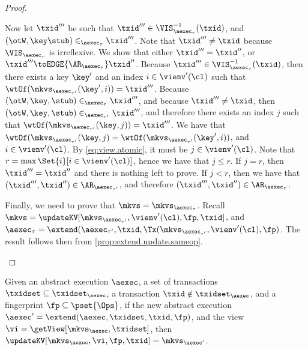 \begin{proof}
\begin{itemize}
\begin{itemize}
Now let $\txid'''$ be such that $\txid''' \in \VIS^{-1}_{\aexec_{\tau}}(\txid)$, and $(\otW, \key \stub) \in_{\aexec_{\tau}} \txid'''$. 
Note that $\txid''' \neq \txid$ because $\VIS_{\aexec_{\tau}}$ is irreflexive.
We show that either $\txid''' = \txid''$, or $\txid''' \toEDGE{\AR_{\aexec_{\tau}}} \txid''$. 
Because $\txid''' \in \VIS^{-1}_{\aexec_{\tau}}(\txid)$, then there exists a key $\key'$ and an index $i \in \vienv'(\cl)$ 
such that $\wtOf(\mkvs_{\aexec_{\tau'}}(\key', i)) = \txid'''$. Because $(\otW, \key, \stub) \in_{\aexec_{\tau}} \txid'''$, 
and because $\txid''' \neq \txid$, then $(\otW, \key, \stub) \in_{\aexec_{\tau'}} \txid'''$, and therefore there exists 
an index $j$ such that $\wtOf(\mkvs_{\aexec_{\tau'}}(\key, j)) = \txid'''$. We have that $\wtOf(\mkvs_{\aexec_{\tau'}}(\key, j) = 
\wtOf(\mkvs_{\aexec_{\tau'}}(\key', i))$, and $i \in \vienv'(\cl)$. By \cref{eq:view.atomic}, it must be $j \in \vienv'(\cl)$. 
Note that $r = \max\Set{i}[ i \in \vienv'(\cl)]$, hence we have that $j \leq r$. If $j = r$, then $\txid''' = \txid''$ and 
there is nothing left to prove. If $j < r$, then we have that $(\txid''', \txid'') \in \AR_{\aexec_{\tau'}}$, and 
therefore $(\txid''', \txid'') \in \AR_{\aexec_{\tau}}$.
\end{itemize}
Finally, we need to prove that $\mkvs = \mkvs_{\aexec_{\tau}}$.
Recall $\mkvs = \updateKV[\mkvs_{\aexec_{\tau'}}, \vienv'(\cl), \fp, \txid]$, 
and $\aexec_{\tau} = \extend(\aexec_{\tau'}, \txid, \Tx(\mkvs_{\aexec_{\tau'}}, \vienv'(\cl), \fp)$. 
The result follows then from \cref{prop:extend.update.sameop}. 
\end{itemize}
\end{proof}


\begin{proposition}
\label{prop:extend.update.sameop}
Given an abstract execution $\aexec$, a set of transactions $\txidset \subseteq \txidset_{\aexec}$,
a transaction $\txid \notin \txidset_{\aexec}$, and a fingerprint $\fp \subseteq \pset{\Ops}$,
if the new abstract execution $\aexec' = \extend(\aexec, \txidset, \txid, \fp)$,
and the view $\vi = \getView[\mkvs_{\aexec}, \txidset]$,
then $\updateKV[\mkvs_{\aexec}, \vi, \fp, \txid] = \mkvs_{\aexec'}$.
\end{proposition}

